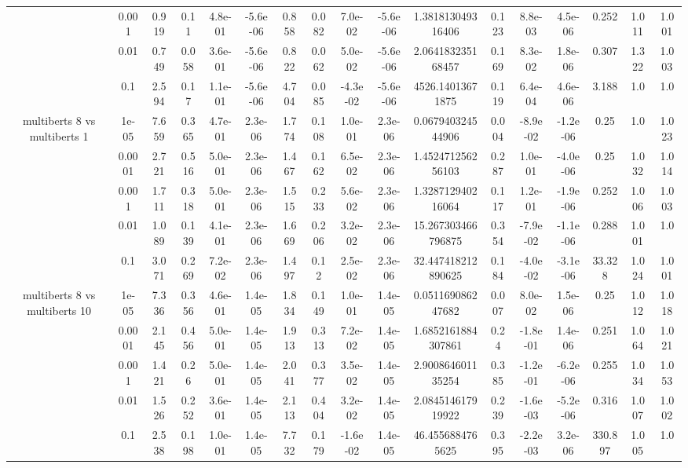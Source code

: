 \begin{tabular}{|c|c|c|c|c|c|c|c|c|c|c|c|c|c|c|c|c|}
 & 0.001 & 0.919 & 0.11 & 4.8e-01 & -5.6e-06 & 0.858 & 0.082 & 7.0e-02 & -5.6e-06 & 1.381813049316406 & 0.123 & 8.8e-03 & 4.5e-06 & 0.252 & 1.011 & 1.001 \\
 & 0.01 & 0.749 & 0.058 & 3.6e-01 & -5.6e-06 & 0.822 & 0.062 & 5.0e-02 & -5.6e-06 & 2.064183235168457 & 0.169 & 8.3e-02 & 1.8e-06 & 0.307 & 1.322 & 1.003 \\
 & 0.1 & 2.594 & 0.17 & 1.1e-01 & -5.6e-06 & 4.704 & 0.085 & -4.3e-02 & -5.6e-06 & 4526.14013671875 & 0.119 & 6.4e-04 & 4.6e-06 & 3.188 & 1.0 & 1.0 \\
\hline
\multirow{5}{*}{multiberts 8 vs multiberts 1} & 1e-05 & 7.659 & 0.365 & 4.7e-01 & 2.3e-06 & 1.774 & 0.108 & 1.0e-01 & 2.3e-06 & 0.067940324544906 & 0.004 & -8.9e-02 & -1.2e-06 & 0.25 & 1.0 & 1.023 \\
 & 0.0001 & 2.721 & 0.516 & 5.0e-01 & 2.3e-06 & 1.467 & 0.162 & 6.5e-02 & 2.3e-06 & 1.452471256256103 & 0.287 & 1.0e-01 & -4.0e-06 & 0.25 & 1.032 & 1.014 \\
 & 0.001 & 1.711 & 0.318 & 5.0e-01 & 2.3e-06 & 1.515 & 0.233 & 5.6e-02 & 2.3e-06 & 1.328712940216064 & 0.117 & 1.2e-01 & -1.9e-06 & 0.252 & 1.006 & 1.003 \\
 & 0.01 & 1.089 & 0.139 & 4.1e-01 & 2.3e-06 & 1.669 & 0.206 & 3.2e-02 & 2.3e-06 & 15.267303466796875 & 0.354 & -7.9e-02 & -1.1e-06 & 0.288 & 1.001 & 1.0 \\
 & 0.1 & 3.071 & 0.269 & 7.2e-02 & 2.3e-06 & 1.497 & 0.12 & 2.5e-02 & 2.3e-06 & 32.447418212890625 & 0.184 & -4.0e-02 & -3.1e-06 & 33.328 & 1.024 & 1.001 \\
\hline
\multirow{5}{*}{multiberts 8 vs multiberts 10} & 1e-05 & 7.336 & 0.356 & 4.6e-01 & 1.4e-05 & 1.834 & 0.149 & 1.0e-01 & 1.4e-05 & 0.051169086247682 & 0.007 & 8.0e-02 & 1.5e-06 & 0.25 & 1.012 & 1.018 \\
 & 0.0001 & 2.145 & 0.456 & 5.0e-01 & 1.4e-05 & 1.913 & 0.313 & 7.2e-02 & 1.4e-05 & 1.6852161884307861 & 0.24 & -1.8e-01 & 1.4e-06 & 0.251 & 1.064 & 1.021 \\
 & 0.001 & 1.421 & 0.26 & 5.0e-01 & 1.4e-05 & 2.041 & 0.377 & 3.5e-02 & 1.4e-05 & 2.900864601135254 & 0.385 & -1.2e-01 & -6.2e-06 & 0.255 & 1.034 & 1.053 \\
 & 0.01 & 1.526 & 0.252 & 3.6e-01 & 1.4e-05 & 2.113 & 0.404 & 3.2e-02 & 1.4e-05 & 2.084514617919922 & 0.239 & -1.6e-03 & -5.2e-06 & 0.316 & 1.007 & 1.002 \\
 & 0.1 & 2.538 & 0.198 & 1.0e-01 & 1.4e-05 & 7.732 & 0.179 & -1.6e-02 & 1.4e-05 & 46.4556884765625 & 0.395 & -2.2e-03 & 3.2e-06 & 330.897 & 1.005 & 1.0 \\

\end{tabular}
